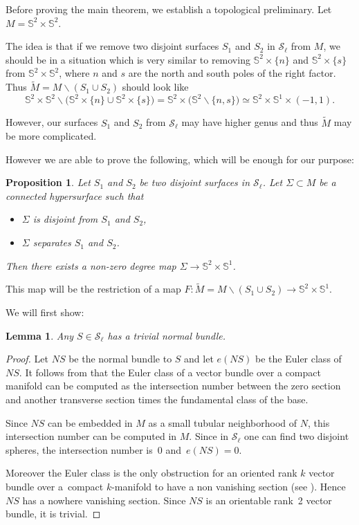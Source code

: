 \documentclass[10pt,a4paper]{amsart}
\numberwithin{equation}{section}
\newtheorem{lem}[thm]{Lemma}
\newtheorem{prop}[thm]{Proposition}
{ \theoremstyle{definition}
\newtheorem{dfn}[thm]{Definition}
\newtheorem{Note}[thm]{Note}
\newtheorem{ex}[thm]{Example}
\newtheorem{rem}[thm]{Remark} }
\begin{document}
Before proving the main theorem, we establish a topological
preliminary. Let $M=\mathbb{S}^2\times\mathbb{S}^2$.

The idea is that if we remove two disjoint surfaces $S_1$ and $S_2$ in
$\mathcal{S}_\ell$ from $M$, we should be in a situation which is very
similar to removing $\mathbb{S}^2\times\{n\}$ and
$\mathbb{S}^2\times\{s\}$ from $\mathbb{S}^2\times\mathbb{S}^2$, where
$n$ and $s$ are the north and south
poles of the right factor. Thus $\tilde M=M\backslash (S_1\cup S_2)$
should look like
\[\mathbb{S}^2\times\mathbb{S}^2\backslash\big(\mathbb{S}^2\times\{n\}\cup
 \mathbb{S}^2\times\{s\}\big)=\mathbb{S}^2\times
\big(\mathbb{S}^2\backslash\{n,s\}\big)\simeq \mathbb{S}^2\times
 \mathbb{S}^1\times (-1,1).\]

However, our surfaces $S_1$ and $S_2$ from $\mathcal{S}_\ell$ may have
higher genus and thus $\tilde M$ may be more complicated.

However we are able to prove the following, which will be enough for our purpose:

\begin{prop}\label{prop-top}
 Let $S_1$ and $S_2$ be two disjoint surfaces in
 $\mathcal{S}_\ell$. Let $\Sigma\subset M$ be a connected hypersurface such
 that
 \begin{itemize}\itemsep=0pt
 \item $\Sigma$ is disjoint from $S_1$ and $S_2$,
 \item $\Sigma$ separates $S_1$ and $S_2$.
 \end{itemize}
 Then there exists a non-zero degree map $\Sigma\to\mathbb{S}^2\times\mathbb{S}^1$.
\end{prop}
This map will be the restriction of a map $F\colon\tilde M=M\backslash
(S_1\cup S_2)\to \mathbb{S}^2\times\mathbb{S}^1$.

We will first show:
\begin{lem}\label{lem-norm}
 Any $S\in \mathcal{S}_\ell$ has a trivial normal bundle.
\end{lem}
\begin{proof}
 Let $NS$ be the normal bundle to $S$ and let $e(NS)$ be the Euler
 class of~$NS$. It follows from \cite[Theorem~11.17, p.~125]{BottTu} that the Euler class of a vector bundle over a compact manifold can be computed as the intersection number between the zero section and another
 transverse section times the fundamental class of the base.

 Since $NS$ can be embedded in $M$ as a small tubular neighborhood of
 $N$, this intersection number can be computed in $M$. Since in
 $\mathcal{S}_\ell$ one can find two disjoint spheres, the
 intersection number is~0 and~$e(NS)=0$.

 Moreover the Euler class is the only obstruction for an oriented
 rank $k$ vector bundle over a~compact $k$-manifold to have a non
 vanishing section (see \cite[Proposition~3.22]{hatcher2003vector}). Hence $NS$ has a nowhere vanishing section. Since $NS$ is an
 orientable rank~2 vector bundle, it is trivial.
\end{proof}
\end{document}
